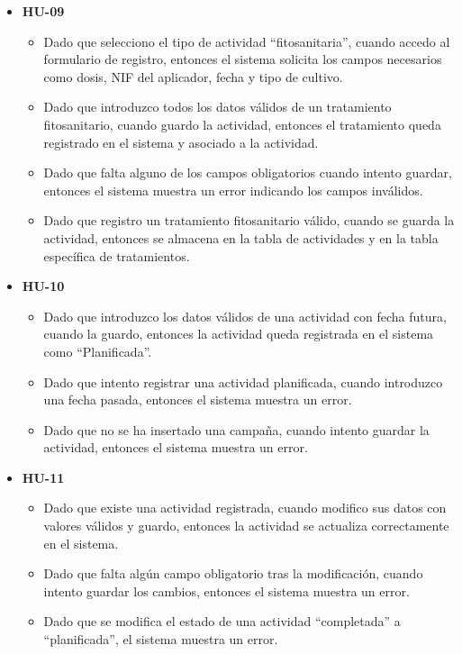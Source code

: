 \begin{itemize}
    \item \textbf{HU-09}
    \begin{itemize}
        \item Dado que selecciono el tipo de actividad ``fitosanitaria'', cuando accedo al formulario de registro, entonces el sistema solicita los campos 
        necesarios como dosis, NIF del aplicador, fecha y tipo de cultivo.
        \item Dado que introduzco todos los datos válidos de un tratamiento fitosanitario, cuando guardo la actividad, entonces el tratamiento queda registrado 
        en el sistema y asociado a la actividad.
        \item Dado que falta alguno de los campos obligatorios cuando intento guardar, entonces el sistema muestra un error indicando los campos inválidos.
        \item Dado que registro un tratamiento fitosanitario válido, cuando se guarda la actividad, entonces se almacena en la tabla de actividades y en la 
        tabla específica de tratamientos.
    \end{itemize}
\end{itemize}

\begin{itemize}
    \item \textbf{HU-10}
    \begin{itemize}
        \item Dado que introduzco los datos válidos de una actividad con fecha futura, cuando la guardo, entonces la actividad queda registrada en el sistema 
        como ``Planificada''.
        \item Dado que intento registrar una actividad planificada, cuando introduzco una fecha pasada, entonces el sistema muestra un error.
        \item Dado que no se ha insertado una campaña, cuando intento guardar la actividad, entonces el sistema muestra un error. 
    \end{itemize}
\end{itemize}

\begin{itemize}
    \item \textbf{HU-11}
    \begin{itemize}
        \item Dado que existe una actividad registrada, cuando modifico sus datos con valores válidos y guardo, entonces la actividad se actualiza correctamente 
        en el sistema.
        \item Dado que falta algún campo obligatorio tras la modificación, cuando intento guardar los cambios, entonces el sistema muestra un error.
        \item Dado que se modifica el estado de una actividad ``completada'' a ``planificada'', el sistema muestra un error. 
    \end{itemize}
\end{itemize}

